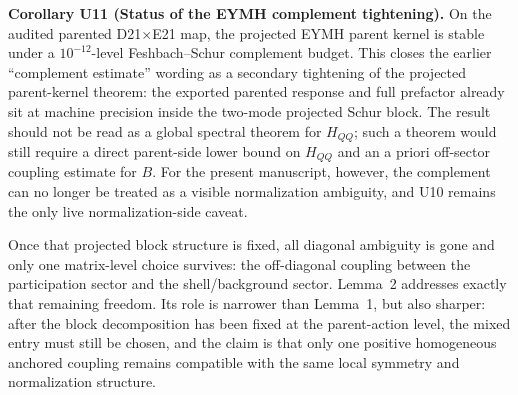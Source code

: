 \documentclass[aps,prd,onecolumn,notitlepage,nofootinbib,superscriptaddress,11pt,floatfix]{revtex4-2}
\begin{document}
\medskip\noindent\textbf{Corollary U11 (Status of the EYMH complement tightening).}
On the audited parented D21\(\times\)E21 map, the projected EYMH parent kernel is stable under a \(10^{-12}\)-level Feshbach--Schur complement budget.  This closes the earlier ``complement estimate'' wording as a secondary tightening of the projected parent-kernel theorem: the exported parented response and full prefactor already sit at machine precision inside the two-mode projected Schur block.  The result should not be read as a global spectral theorem for \(H_{QQ}\); such a theorem would still require a direct parent-side lower bound on \(H_{QQ}\) and an a priori off-sector coupling estimate for \(B\).  For the present manuscript, however, the complement can no longer be treated as a visible normalization ambiguity, and U10 remains the only live normalization-side caveat.

Once that projected block structure is fixed, all diagonal ambiguity is gone and only one matrix-level choice survives: the off-diagonal coupling between the participation sector and the shell/background sector. Lemma~2 addresses exactly that remaining freedom. Its role is narrower than Lemma~1, but also sharper: after the block decomposition has been fixed at the parent-action level, the mixed entry must still be chosen, and the claim is that only one positive homogeneous anchored coupling remains compatible with the same local symmetry and normalization structure.
\end{document}
